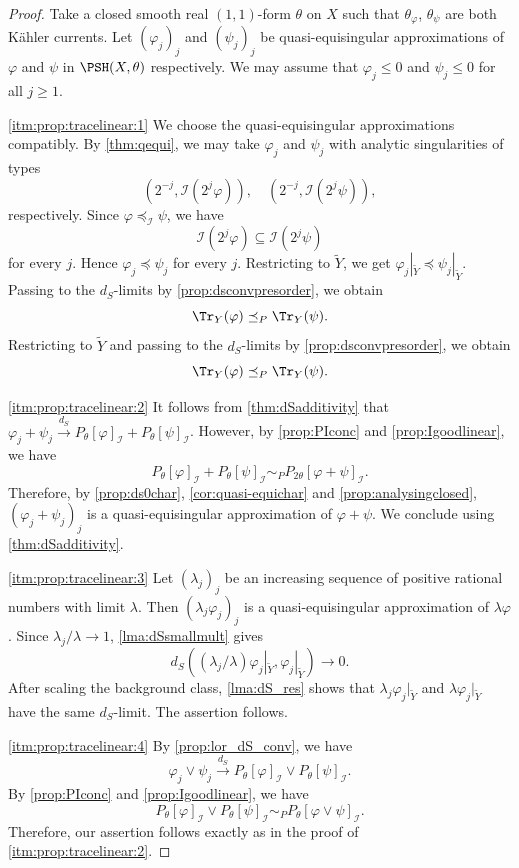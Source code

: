 \begin{proof}
    Take a closed smooth real $(1,1)$-form $\theta$ on $X$ such that $\theta_{\varphi}$, $\theta_{\psi}$ are both Kähler currents.
    Let $(\varphi_j)_j$ and $(\psi_j)_j$ be quasi-equisingular approximations of $\varphi$ and $\psi$ in $\PSH(X,\theta)$ respectively. We may assume that $\varphi_j\leq 0$ and $\psi_j\leq 0$ for all $j\geq 1$.

    \ref{itm:prop:tracelinear:1} We choose the quasi-equisingular approximations compatibly. By \cref{thm:qequi}, we may take $\varphi_j$ and $\psi_j$ with analytic singularities of types
    \[
    \left(2^{-j},\mathcal I(2^j\varphi)\right), \quad \left(2^{-j},\mathcal I(2^j\psi)\right),
    \]
    respectively. Since $\varphi\preceq_{\mathcal I}\psi$, we have
    \[
        \mathcal I(2^j\varphi)\subseteq \mathcal I(2^j\psi)
    \]
    for every $j$. Hence $\varphi_j\preceq\psi_j$ for every $j$. Restricting to $\widetilde{Y}$, we get $\varphi_j|_{\widetilde{Y}}\preceq\psi_j|_{\widetilde{Y}}$. Passing to the $d_S$-limits by \cref{prop:dsconvpresorder}, we obtain
    \[
        \Tr_Y(\varphi)\preceq_P\Tr_Y(\psi).
    \]
    Restricting to $\widetilde{Y}$ and passing to the $d_S$-limits by \cref{prop:dsconvpresorder}, we obtain
    \[
        \Tr_Y(\varphi)\preceq_P \Tr_Y(\psi).
    \]

    \ref{itm:prop:tracelinear:2} It follows from \cref{thm:dSadditivity} that $\varphi_j+\psi_j\xrightarrow{d_S}P_{\theta}[\varphi]_{\mathcal{I}}+P_{\theta}[\psi]_{\mathcal{I}}$. However, by \cref{prop:PIconc} and \cref{prop:Igoodlinear}, we have
    \[
        P_{\theta}[\varphi]_{\mathcal{I}}+P_{\theta}[\psi]_{\mathcal{I}}\sim_P P_{2\theta}[\varphi+\psi]_{\mathcal{I}}.
    \]
    Therefore, by \cref{prop:ds0char}, \cref{cor:quasi-equichar} and \cref{prop:analysingclosed}, $(\varphi_j+\psi_j)_j$ is a quasi-equisingular approximation of $\varphi+\psi$. We conclude using \cref{thm:dSadditivity}.

    \ref{itm:prop:tracelinear:3} Let $(\lambda_j)_j$ be an increasing sequence of positive rational numbers with limit $\lambda$. Then $(\lambda_j\varphi_j)_j$ is a quasi-equisingular approximation of $\lambda\varphi$.
    Since $\lambda_j/\lambda\to 1$, \cref{lma:dSsmallmult} gives
    \[
        d_S\left((\lambda_j/\lambda)\varphi_j|_{\widetilde{Y}},\varphi_j|_{\widetilde{Y}}\right)\to 0.
    \]
    After scaling the background class, \cref{lma:dS_res} shows that $\lambda_j\varphi_j|_{\widetilde{Y}}$ and $\lambda\varphi_j|_{\widetilde{Y}}$ have the same $d_S$-limit. The assertion follows.

    \ref{itm:prop:tracelinear:4} By \cref{prop:lor_dS_conv}, we have
    \[
        \varphi_j\lor \psi_j\xrightarrow{d_S} P_{\theta}[\varphi]_{\mathcal{I}}\lor P_{\theta}[\psi]_{\mathcal{I}}.
    \]
    By \cref{prop:PIconc} and \cref{prop:Igoodlinear}, we have
    \[
        P_{\theta}[\varphi]_{\mathcal{I}}\lor P_{\theta}[\psi]_{\mathcal{I}}\sim_P P_{\theta}[\varphi\lor \psi]_{\mathcal{I}}.
    \]
    Therefore, our assertion follows exactly as in the proof of \ref{itm:prop:tracelinear:2}.
\end{proof}

